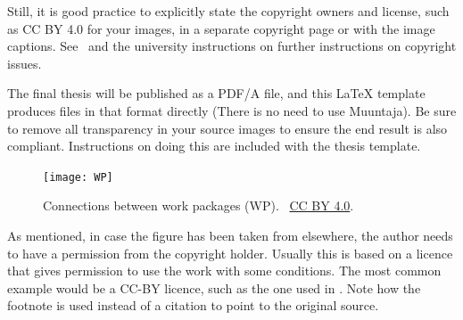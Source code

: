 Still, it is good practice to explicitly state the copyright owners and
license, such as CC BY 4.0 for your images, in a separate copyright
page or with the image captions. See~ and the
university instructions on further instructions on copyright issues.

The final thesis will be published as a PDF/A file, and this LaTeX
template produces files in that format directly (There is no need to
use Muuntaja). Be sure to remove all transparency in your source
images to ensure the end result is also compliant. Instructions on doing this
are included with the thesis template.

\begin{figure}[ht]
  \begin{center}
    \texttt{[image: WP]}
  \end{center}
  \caption{Connections between work packages (WP).
    \copyrightstring\ \href{https://creativecommons.org/licenses/by/4.0/}{CC
  BY 4.0}.}
  \label{fig:work_packages}
\end{figure}

As mentioned, in case the figure has been taken from elsewhere, the
author needs to have a permission from the copyright holder. Usually
this is based on a licence that gives permission to use the work with
some conditions. The most common example would be a CC-BY licence,
such as the one used in . Note how the footnote
is used instead of a citation to point to the original source.


